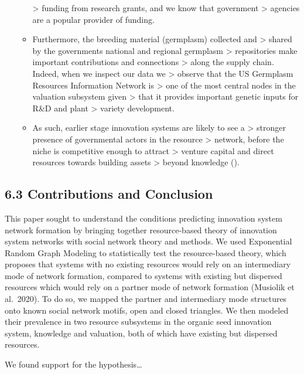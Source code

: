 \documentclass[twoside,12pt,final]{ucthesis-CA2012}
\begin{document}
\begin{ucmainmatter}
\begin{itemize}
\begin{itemize}
    \textgreater{} funding from research grants, and we know that government
    \textgreater{} agencies are a popular provider of funding.
  \item
    Furthermore, the breeding material (germplasm) collected and
    \textgreater{} shared by the government\textquotesingle s national and regional germplasm
    \textgreater{} repositories make important contributions and connections
    \textgreater{} along the supply chain. Indeed, when we inspect our data we
    \textgreater{} observe that the US Germplasm Resources Information Network is
    \textgreater{} one of the most central nodes in the valuation subsystem given
    \textgreater{} that it provides important genetic inputs for R\&D and plant
    \textgreater{} variety development.
  \item
    As such, earlier stage innovation systems are likely to see a
    \textgreater{} stronger presence of governmental actors in the resource
    \textgreater{} network, before the niche is competitive enough to attract
    \textgreater{} venture capital and direct resources towards building assets
    \textgreater{} beyond knowledge ().
  \end{itemize}
\end{itemize}
\hypertarget{contributions-and-conclusion}{%
\subsection{6.3 Contributions and Conclusion}\label{contributions-and-conclusion}}

This paper sought to understand the conditions predicting innovation
system network formation by bringing together resource-based theory of
innovation system networks with social network theory and methods. We
used Exponential Random Graph Modeling to statistically test the
resource-based theory, which proposes that systems with no existing
resources would rely on an intermediary mode of network formation,
compared to systems with existing but dispersed resources which would
rely on a partner mode of network formation (Musiolik et al.~2020). To
do so, we mapped the partner and intermediary mode structures onto known
social network motifs, open and closed triangles. We then modeled their
prevalence in two resource subsystems in the organic seed innovation
system, knowledge and valuation, both of which have existing but
dispersed resources.

We found support for the hypothesis\ldots{}


\end{ucmainmatter}
\end{document}
